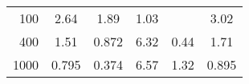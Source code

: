 \begin{samepage}
\begin{table}[H]
\begin{tabular}{r c c c c c}
        100 & 2.64   & 1.89   & 1.03   &        & 3.02   \\
        400 & 1.51   & 0.872  & 6.32   & 0.44   & 1.71   \\
        1000 & 0.795 & 0.374  & 6.57   & 1.32   & 0.895  \\
        \bottomrule
    \end{tabular}
\end{table}


\end{samepage}
